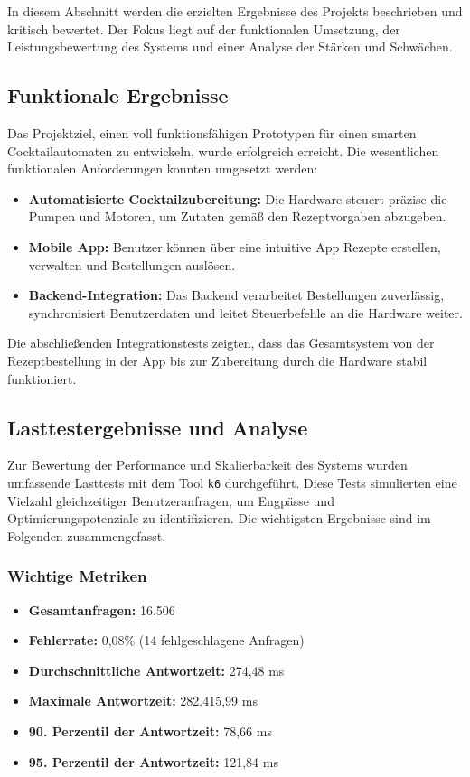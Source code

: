 In diesem Abschnitt werden die erzielten Ergebnisse des Projekts beschrieben und kritisch bewertet. Der Fokus liegt auf der funktionalen Umsetzung, der Leistungsbewertung des Systems und einer Analyse der Stärken und Schwächen.

\subsection{Funktionale Ergebnisse}

Das Projektziel, einen voll funktionsfähigen Prototypen für einen smarten Cocktailautomaten zu entwickeln, wurde erfolgreich erreicht. Die wesentlichen funktionalen Anforderungen konnten umgesetzt werden:

\begin{itemize}
  \item \textbf{Automatisierte Cocktailzubereitung:} Die Hardware steuert präzise die Pumpen und Motoren, um Zutaten gemäß den Rezeptvorgaben abzugeben.
  \item \textbf{Mobile App:} Benutzer können über eine intuitive App Rezepte erstellen, verwalten und Bestellungen auslösen.
  \item \textbf{Backend-Integration:} Das Backend verarbeitet Bestellungen zuverlässig, synchronisiert Benutzerdaten und leitet Steuerbefehle an die Hardware weiter.
\end{itemize}

Die abschließenden Integrationstests zeigten, dass das Gesamtsystem von der Rezeptbestellung in der App bis zur Zubereitung durch die Hardware stabil funktioniert.

\subsection{Lasttestergebnisse und Analyse}

Zur Bewertung der Performance und Skalierbarkeit des Systems wurden umfassende Lasttests mit dem Tool \texttt{k6} durchgeführt. Diese Tests simulierten eine Vielzahl gleichzeitiger Benutzeranfragen, um Engpässe und Optimierungspotenziale zu identifizieren. Die wichtigsten Ergebnisse sind im Folgenden zusammengefasst.

\subsubsection*{Wichtige Metriken}
\begin{itemize}
    \item \textbf{Gesamtanfragen:} 16.506
    \item \textbf{Fehlerrate:} 0,08\% (14 fehlgeschlagene Anfragen)
    \item \textbf{Durchschnittliche Antwortzeit:} 274,48 ms
    \item \textbf{Maximale Antwortzeit:} 282.415,99 ms
    \item \textbf{90. Perzentil der Antwortzeit:} 78,66 ms
    \item \textbf{95. Perzentil der Antwortzeit:} 121,84 ms
\end{itemize}

